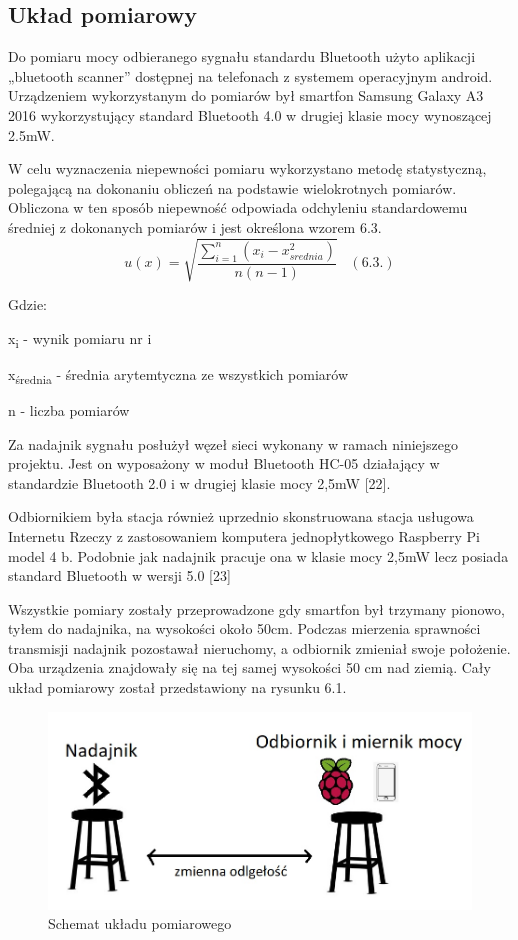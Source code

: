 \documentclass[12pt, twoside, openany]{mwrep}
\begin{document}
\subsection{Układ pomiarowy}
Do pomiaru mocy odbieranego sygnału standardu Bluetooth użyto aplikacji „bluetooth scanner” dostępnej na telefonach z systemem operacyjnym android. Urządzeniem wykorzystanym do pomiarów był smartfon Samsung Galaxy A3 2016 wykorzystujący standard Bluetooth 4.0 w drugiej klasie mocy wynoszącej 2.5mW.
\par
W celu wyznaczenia niepewności pomiaru wykorzystano metodę statystyczną, polegającą na dokonaniu obliczeń na podstawie wielokrotnych pomiarów. Obliczona w ten sposób niepewność odpowiada odchyleniu standardowemu średniej z dokonanych pomiarów i jest określona wzorem  6.3.
\[ u(x) = \sqrt{ \frac{ \sum_{i=1}^{n} (x_i -x_{srednia}^2) } { n(n-1)  }}  \; \; \;  (6.3.)\]
\par
Gdzie: \par
 x\textsubscript{i}  - wynik pomiaru nr i 
\par
 x\textsubscript{średnia}  - średnia arytemtyczna ze wszystkich pomiarów
\par
 n - liczba pomiarów
\par

Za nadajnik sygnału posłużył węzeł sieci wykonany w ramach niniejszego projektu. Jest on wyposażony w moduł Bluetooth HC-05 działający w standardzie Bluetooth 2.0 i w drugiej klasie mocy 2,5mW [22]. \par
Odbiornikiem była stacja również uprzednio skonstruowana stacja usługowa Internetu Rzeczy z zastosowaniem komputera jednopłytkowego Raspberry Pi model 4 b. Podobnie jak nadajnik pracuje ona w klasie mocy 2,5mW lecz posiada standard Bluetooth w wersji 5.0 [23] \par
Wszystkie pomiary zostały przeprowadzone gdy smartfon był trzymany pionowo, tyłem do nadajnika, na wysokości około 50cm. Podczas mierzenia sprawności transmisji nadajnik pozostawał nieruchomy, a odbiornik zmieniał swoje położenie. Oba urządzenia znajdowały się na tej samej wysokości 50 cm nad ziemią. Cały układ pomiarowy został przedstawiony na rysunku 6.1.

\begin{figure}[H]
\centering
\includegraphics[scale=0.6]{uklad}
\caption{Schemat układu pomiarowego}
\end{figure}
\end{document}
